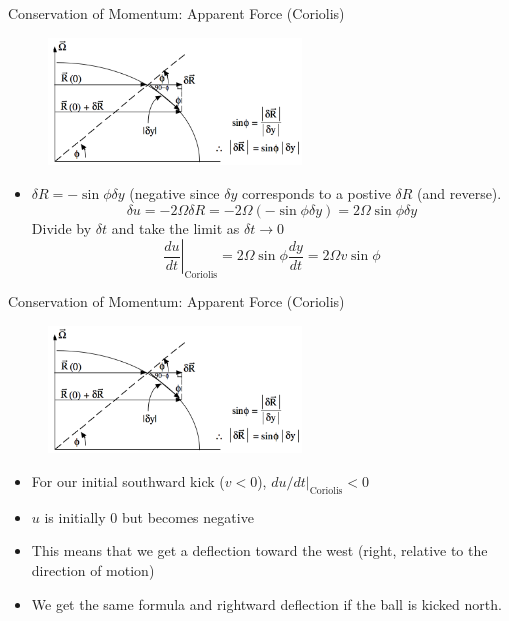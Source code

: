 \begin{frame}{Conservation of Momentum: Apparent Force (Coriolis)}
\begin{figure}
		\includegraphics[width=0.6\textwidth]{coriolis4}	
	\end{figure}
\begin{itemize}
	\item $\delta R=-\sin \phi \delta y$ (negative since $\delta y$ corresponds to a postive $\delta R$ (and reverse).
	$$\delta u = - 2\Omega \delta R = -2\Omega (-\sin \phi \delta y) = 2\Omega \sin \phi \delta y$$
	Divide by $\delta t$ and take the limit as $\delta t \rightarrow 0$
	$$\left.\frac{du}{dt}\right|_{\text{Coriolis}} = 2\Omega \sin \phi \frac{dy}{dt} = 2\Omega v \sin \phi$$
\end{itemize}
\end{frame}
\begin{frame}{Conservation of Momentum: Apparent Force (Coriolis)}
\begin{figure}
		\includegraphics[width=0.6\textwidth]{coriolis4}	
	\end{figure}
\begin{itemize}
	\item For our initial southward kick ($v<0$), $du/dt|_{\text{Coriolis}} < 0$
	\item $u$ is initially $0$ but becomes negative
	\item This means that we get a deflection toward the west (right, relative to the direction of motion)
	\item We get the same formula and rightward deflection if the ball is kicked north.
\end{itemize}
\end{frame}
